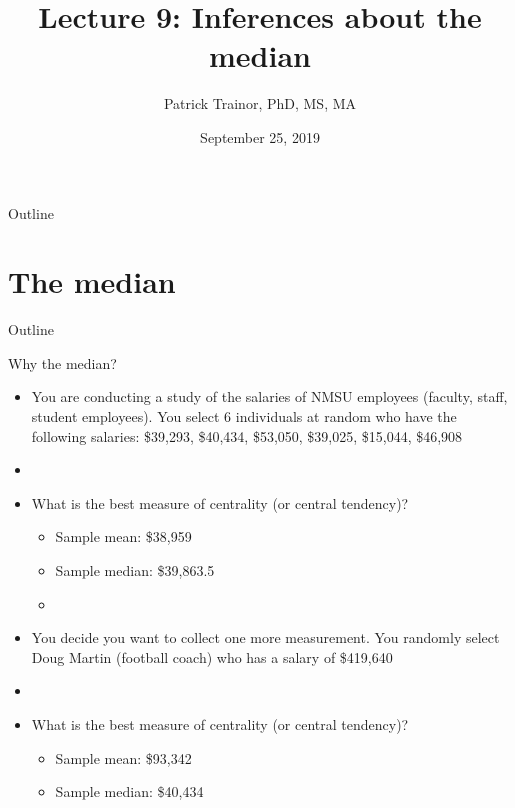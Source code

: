 \documentclass[xcolor=dvipsnames]{beamer}
\title[Lecture 9]{Lecture 9: Inferences about the median}
\author[Patrick Trainor]{Patrick Trainor, PhD, MS, MA}
\institute[NMSU]{New Mexico State University}
\date{September 25, 2019}
\begin{document}
\begin{frame}
	\maketitle
\end{frame}

\begin{frame}{Outline}
	\tableofcontents[hideallsubsections]
\end{frame}

\section{The median}
\begin{frame}{Outline}
\tableofcontents[currentsection,subsectionstyle=show/shaded/hide]
\end{frame}

\begin{frame}{Why the median?}
	\begin{itemize}
		\item You are conducting a study of the salaries of NMSU employees (faculty, staff, student employees). You select 6 individuals at random who have the following salaries: \$39,293, \$40,434, \$53,050, \$39,025, \$15,044, \$46,908 \pause
		\item[]
		\item What is the best measure of centrality (or central tendency)? \pause
		\begin{itemize}
			\item Sample mean: \$38,959 \pause
			\item Sample median: \$39,863.5 \pause
			\item[]
		\end{itemize}
	\item You decide you want to collect one more measurement. You randomly select Doug Martin (football coach) who has a salary of \$419,640 \pause
	\item[]
			\item What is the best measure of centrality (or central tendency)? \pause
	\begin{itemize}
		\item Sample mean: \$93,342 \pause
		\item Sample median: \$40,434
	\end{itemize}
	\end{itemize}
\end{frame}
\end{document}
